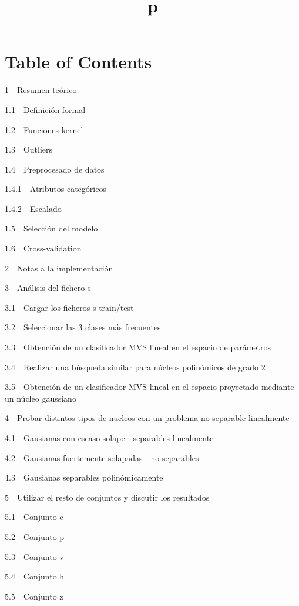 \documentclass[11pt]{article}
\title{p}
\begin{document}
    
    
    \maketitle
    
    

    
    \section{Table of Contents}\label{table-of-contents}

{1~~}Resumen teórico

{1.1~~}Definición formal

{1.2~~}Funciones kernel

{1.3~~}Outliers

{1.4~~}Preprocesado de datos

{1.4.1~~}Atributos categóricos

{1.4.2~~}Escalado

{1.5~~}Selección del modelo

{1.6~~}Cross-validation

{2~~}Notas a la implementación

{3~~}Análisis del fichero s

{3.1~~}Cargar los ficheros s-train/test

{3.2~~}Seleccionar las 3 clases más frecuentes

{3.3~~}Obtención de un clasificador MVS lineal en el espacio de
parámetros

{3.4~~}Realizar una búsqueda similar para núcleos polinómicos de grado 2

{3.5~~}Obtención de un clasificador MVS lineal en el espacio proyectado
mediante un núcleo gaussiano

{4~~}Probar distintos tipos de nucleos con un problema no separable
linealmente

{4.1~~}Gausianas con escaso solape - separables linealmente

{4.2~~}Gausianas fuertemente solapadas - no separables

{4.3~~}Gausianas separables polinómicamente

{5~~}Utilizar el resto de conjuntos y discutir los resultados

{5.1~~}Conjunto c

{5.2~~}Conjunto p

{5.3~~}Conjunto v

{5.4~~}Conjunto h

{5.5~~}Conjunto z
\end{document}
